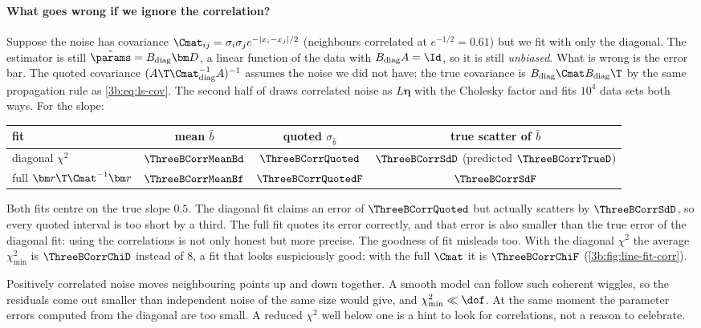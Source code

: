\paragraph{What goes wrong if we ignore the correlation?}
Suppose the noise has covariance $\Cmat_{ij}=\sigma_i\sigma_je^{-|x_i-x_j|/2}$
(neighbours correlated at $e^{-1/2}=0.61$) but we fit with only the
diagonal. The estimator is still $\hat\params=B_{\text{diag}}\bm D$, a
linear function of the data with $B_{\text{diag}}A=\Id$, so it is still
\emph{unbiased}. What is wrong is the error bar. The quoted covariance
$(A\T\Cmat_{\text{diag}}^{-1}A)^{-1}$ assumes the noise we did not have; the
true covariance is $B_{\text{diag}}\Cmat B_{\text{diag}}\T$ by the same
propagation rule as \eqref{3b:eq:ls-cov}. The second half of
 draws correlated noise as $L\bm\eta$ with the
Cholesky factor and fits $10^4$ data sets both ways. For the slope:
\begin{center}
\small
\begin{tabular}{lccc}
  \hline
  fit & mean $\hat b$ & quoted $\sigma_{\hat b}$ & true scatter of $\hat b$\\
  \hline
  diagonal $\chi^2$ & $\ThreeBCorrMeanBd$ & $\ThreeBCorrQuoted$ & $\ThreeBCorrSdD$ (predicted $\ThreeBCorrTrueD$)\\
  full $\bm r\T\Cmat^{-1}\bm r$ & $\ThreeBCorrMeanBf$ & $\ThreeBCorrQuotedF$ & $\ThreeBCorrSdF$\\
  \hline
\end{tabular}
\end{center}
Both fits centre on the true slope $0.5$. The diagonal fit claims an error
of $\ThreeBCorrQuoted$ but actually scatters by $\ThreeBCorrSdD$, so every
quoted interval is too short by a third. The full fit quotes its error
correctly, and that error is also smaller than the true error of the
diagonal fit: using the correlations is not only honest but more precise.
The goodness of fit misleads too. With the diagonal $\chi^2$ the average
$\chi^2_{\min}$ is $\ThreeBCorrChiD$ instead of $8$, a fit that looks
suspiciously good; with the full $\Cmat$ it is $\ThreeBCorrChiF$
(\cref{3b:fig:line-fit-corr}).

\begin{pitfall}
Positively correlated noise moves neighbouring points up and down
together. A smooth model can follow such coherent wiggles, so the residuals
come out smaller than independent noise of the same size would give, and
$\chi^2_{\min}\ll\dof$. At the same moment the parameter errors computed from
the diagonal are too small. A reduced $\chi^2$ well below one is a hint to
look for correlations, not a reason to celebrate.
\end{pitfall}

